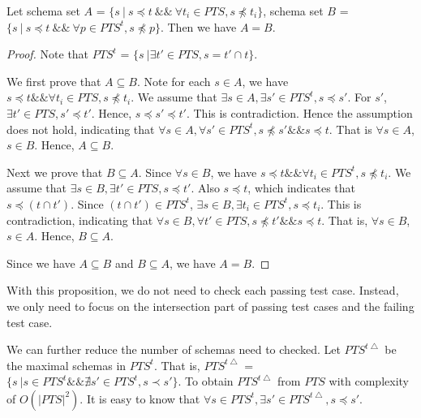 \begin{proposition}\label{pro:healthysintequal}
Let schema set $A$ = $\{ s\ |\ s \preceq t\ \&\&\  \forall t_{i} \in PTS, s \npreceq t_{i} \} $,  schema set $B$ = $\{ s\ |\ s \preceq t\ \&\&\ \forall p \in PTS^{t}, s \npreceq p \}$. Then we have $A = B$.
\end{proposition}

\begin{proof}
Note that $PTS^{t}$ = $\{ s\ |\exists t' \in PTS, s =  t' \cap t \}$.

We first prove that $A \subseteq B$. Note for each $s \in A$, we have $s \preceq t \&\& \forall t_{i} \in PTS, s \npreceq t_{i}$. We assume that $\exists s \in A, \exists s' \in PTS^{t}, s \preceq s'$. For $s'$, $\exists t' \in PTS, s' \preceq t'$. Hence, $s  \preceq s' \preceq t'$. This is contradiction. Hence the assumption does not hold, indicating that $\forall s \in A, \forall s' \in PTS^{t}, s \npreceq s' \&\& s \preceq t$. That is $\forall s \in A$, $s \in B$. Hence, $A \subseteq B$.

Next we prove that $B \subseteq A$. Since $\forall s \in B$, we have $s \preceq t \&\& \forall t_{i} \in  PTS^{t}, s \npreceq t_{i}$. We assume that $\exists s \in B, \exists t' \in PTS, s \preceq t'$. Also $s \preceq t$, which indicates that $s \preceq (t \cap t')$.  Since $(t \cap t') \in PTS^{t} $, $\exists s \in B, \exists t_{i} \in PTS^{t}, s \preceq t_{i}$. This is contradiction, indicating that  $\forall s \in B, \forall t' \in PTS, s \npreceq t' \&\& s \preceq t$. That is, $\forall s \in B$, $s \in A$. Hence, $B \subseteq A$.

Since we have $A \subseteq B$ and $B \subseteq A$, we have $A = B$.
\end{proof}

With this proposition, we do not need to check each passing test case. Instead, we only need to focus on the intersection part of passing test cases and the failing test case.

We can further reduce the number of schemas need to checked. Let $PTS^{t\bigtriangleup}$ be the maximal schemas in $PTS^{t}$. That is, $PTS^{t\bigtriangleup}$ = $\{ s\ |  s \in PTS^{t} \&\& \nexists s'  \in PTS^{t}, s \prec s' \}$.  To obtain $PTS^{t\bigtriangleup}$ from $PTS$ with complexity of $O(|PTS|^{2})$. It is easy to know that $\forall s \in PTS^{t}, \exists s' \in PTS^{t\bigtriangleup},  s \preceq s'$.


